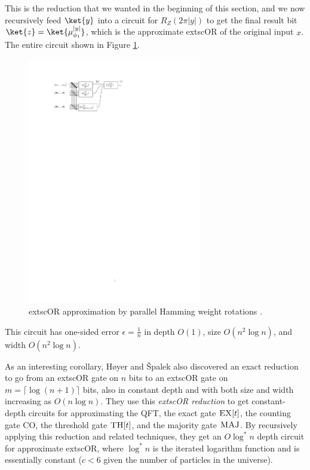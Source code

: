 This is the reduction that we wanted in the beginning of this section, and
we now recursively feed $\ket{y}$ into a circuit for $R_Z(2\pi|y|)$ to get
the final result bit $\ket{z} = \ket{\mu_{\phi_1}^{|y|}}$, which is
the approximate 	extsc{OR} of the original input $x$.
The entire circuit shown in Figure \ref{fig:or-approx}.

\begin{center}
\begin{figure}
\label{fig:or-approx}
\includegraphics[width=3in]{figures/or-approx.pdf}
\caption{	extsc{OR} approximation by parallel Hamming weight rotations \cite{Hoyer2002}.}
\end{figure}
\end{center}

This circuit has one-sided error $\epsilon = \frac{1}{n}$ in depth $O(1)$,
size $O(n^2 \log n)$, and width $O(n^2 \log n)$.

As an interesting corollary,
H{\o}yer and {\v S}palek also discovered an exact reduction to go from an 	extsc{OR} gate
on $n$ bits to an 	extsc{OR} gate on $m=\lceil \log(n+1) \rceil$ bits, also in
constant depth and with both size and width increasing as $O(n \log n)$.
They use this \emph{	extsc{OR} reduction} to get constant-depth
circuits for approximating the QFT, the exact gate $\textsc{EX}[t]$, the counting gate CO,
the threshold gate $\textsc{TH}[t]$, and the majority gate $\textsc{MAJ}$.
By recursively applying this reduction and related techniques, they
get an $O\log^*{n}$ depth circuit for approximate 	extsc{OR},
where $\log^*n$ is the iterated logarithm function and is essentially constant
($c < 6$ given the number of particles in the universe).


